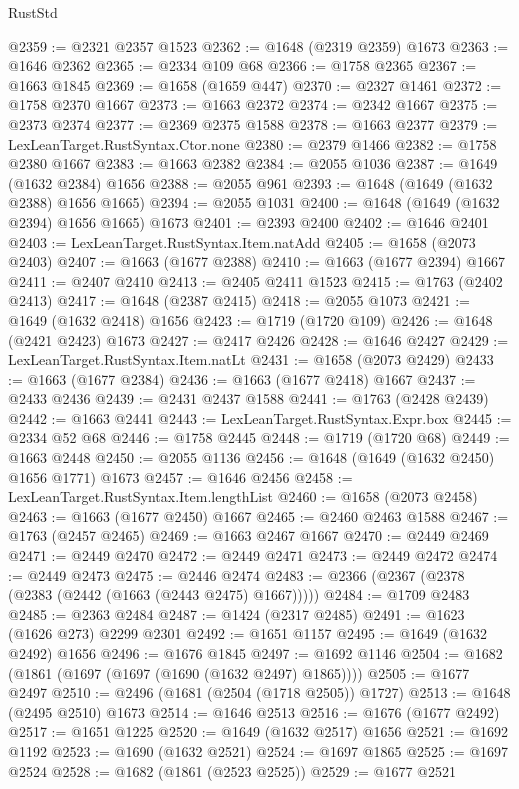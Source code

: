 \begin{lexlean}{RustStd}
\begin{coremodule}
{\begin{coremodule}
{{{{{{{{{{{{{{{{{{{{{{{{{{{{{{{{{{{{{{{{{{{{@2359 := @2321 @2357 @1523
@2362 := @1648 (@2319 @2359) @1673
@2363 := @1646 @2362
@2365 := @2334 @109 @68
@2366 := @1758 @2365
@2367 := @1663 @1845
@2369 := @1658 (@1659 @447)
@2370 := @2327 @1461
@2372 := @1758 @2370 @1667
@2373 := @1663 @2372
@2374 := @2342 @1667
@2375 := @2373 @2374
@2377 := @2369 @2375 @1588
@2378 := @1663 @2377
@2379 := LexLeanTarget.RustSyntax.Ctor.none
@2380 := @2379 @1466
@2382 := @1758 @2380 @1667
@2383 := @1663 @2382
@2384 := @2055 @1036
@2387 := @1649 (@1632 @2384) @1656
@2388 := @2055 @961
@2393 := @1648 (@1649 (@1632 @2388) @1656 @1665)
@2394 := @2055 @1031
@2400 := @1648 (@1649 (@1632 @2394) @1656 @1665) @1673
@2401 := @2393 @2400
@2402 := @1646 @2401
@2403 := LexLeanTarget.RustSyntax.Item.natAdd
@2405 := @1658 (@2073 @2403)
@2407 := @1663 (@1677 @2388)
@2410 := @1663 (@1677 @2394) @1667
@2411 := @2407 @2410
@2413 := @2405 @2411 @1523
@2415 := @1763 (@2402 @2413)
@2417 := @1648 (@2387 @2415)
@2418 := @2055 @1073
@2421 := @1649 (@1632 @2418) @1656
@2423 := @1719 (@1720 @109)
@2426 := @1648 (@2421 @2423) @1673
@2427 := @2417 @2426
@2428 := @1646 @2427
@2429 := LexLeanTarget.RustSyntax.Item.natLt
@2431 := @1658 (@2073 @2429)
@2433 := @1663 (@1677 @2384)
@2436 := @1663 (@1677 @2418) @1667
@2437 := @2433 @2436
@2439 := @2431 @2437 @1588
@2441 := @1763 (@2428 @2439)
@2442 := @1663 @2441
@2443 := LexLeanTarget.RustSyntax.Expr.box
@2445 := @2334 @52 @68
@2446 := @1758 @2445
@2448 := @1719 (@1720 @68)
@2449 := @1663 @2448
@2450 := @2055 @1136
@2456 := @1648 (@1649 (@1632 @2450) @1656 @1771) @1673
@2457 := @1646 @2456
@2458 := LexLeanTarget.RustSyntax.Item.lengthList
@2460 := @1658 (@2073 @2458)
@2463 := @1663 (@1677 @2450) @1667
@2465 := @2460 @2463 @1588
@2467 := @1763 (@2457 @2465)
@2469 := @1663 @2467 @1667
@2470 := @2449 @2469
@2471 := @2449 @2470
@2472 := @2449 @2471
@2473 := @2449 @2472
@2474 := @2449 @2473
@2475 := @2446 @2474
@2483 := @2366 (@2367 (@2378 (@2383 (@2442 (@1663 (@2443 @2475) @1667)))))
@2484 := @1709 @2483
@2485 := @2363 @2484
@2487 := @1424 (@2317 @2485)
@2491 := @1623 (@1626 @273) @2299 @2301
@2492 := @1651 @1157
@2495 := @1649 (@1632 @2492) @1656
@2496 := @1676 @1845
@2497 := @1692 @1146
@2504 := @1682 (@1861 (@1697 (@1697 (@1690 (@1632 @2497) @1865))))
@2505 := @1677 @2497
@2510 := @2496 (@1681 (@2504 (@1718 @2505)) @1727)
@2513 := @1648 (@2495 @2510) @1673
@2514 := @1646 @2513
@2516 := @1676 (@1677 @2492)
@2517 := @1651 @1225
@2520 := @1649 (@1632 @2517) @1656
@2521 := @1692 @1192
@2523 := @1690 (@1632 @2521)
@2524 := @1697 @1865
@2525 := @1697 @2524
@2528 := @1682 (@1861 (@2523 @2525))
@2529 := @1677 @2521
}}}}}}}}}}}}}}}}}}}}}}}}}}}}}}}}}}}}}}}}}}}}
\end{coremodule}}
\end{coremodule}
\end{lexlean}
